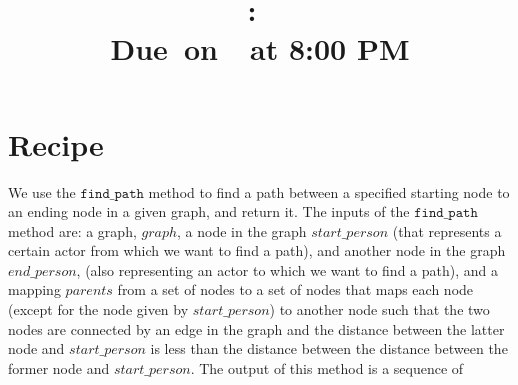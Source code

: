\documentclass{article}
\title{
    \vspace{2in}
    \textmd{\textbf{\hmwkClass:\ \hmwkTitle}}\\
    \normalsize\vspace{0.1in}\small{Due\ on\ \hmwkDueDate\ at 8:00 PM}\\
    \vspace{0.1in}\large{\textit{\hmwkClassInstructor}}
    \vspace{3in}
}
\author{\hmwkAuthorName}
\date{}
\begin{document}
\maketitle
\pagebreak

\section{Recipe}
    
    We use the $\texttt{find\_path}$ method to find a path between a specified starting node to an ending node in a given graph, and return it. The inputs of the $\texttt{find\_path}$ method are: a graph, $graph$, a node in the graph $start\_person$ (that represents a certain actor from which we want to find a path), and another node in the graph $end\_person$, (also representing an actor to which we want to find a path), and a mapping $parents$ from a set of nodes to a set of nodes that maps each node (except for the node given by $start\_person$) to another node such that the two nodes are connected by an edge in the graph and the distance between the latter node and $start\_person$ is less than the distance between the distance between the former node and $start\_person$. The output of this method is a sequence of 



    
\end{document}
